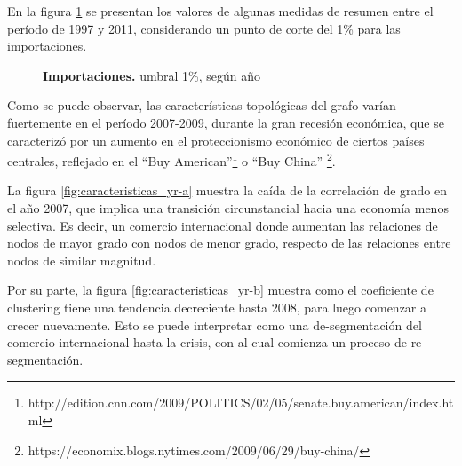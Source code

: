 \documentclass[a4paper]{article}
\begin{document}
En la figura \ref{fig:caracteristicas_yr} se presentan los valores de algunas medidas de resumen entre el período de 1997 y 2011, considerando un punto de corte del 1\% para las importaciones. 



\begin{figure}
\centering
{}
\caption{\textbf{Importaciones.} umbral 1\%, según año}
\label{fig:caracteristicas_yr}
\end{figure}


Como se puede observar, las características topológicas del grafo varían fuertemente en el período 2007-2009, durante la gran recesión económica, que se caracterizó por un aumento en el proteccionismo económico de ciertos países centrales, reflejado en el “Buy American”\footnote{http://edition.cnn.com/2009/POLITICS/02/05/senate.buy.american/index.html} o “Buy China” \footnote{https://economix.blogs.nytimes.com/2009/06/29/buy-china/}. 

La figura \ref{fig:caracteristicas_yr-a} muestra la caída de la correlación de grado en el año 2007, que implica una transición circunstancial hacia una economía menos selectiva. Es decir, un comercio internacional donde aumentan las relaciones de nodos de mayor grado con nodos de menor grado, respecto de las relaciones entre nodos de similar magnitud.            

Por su parte, la figura \ref{fig:caracteristicas_yr-b} muestra como el coeficiente de clustering tiene una tendencia decreciente hasta 2008, para luego comenzar a crecer nuevamente. Esto se puede interpretar como una de-segmentación del comercio internacional hasta la crisis, con al cual comienza un proceso de re-segmentación. \par
\end{document}

